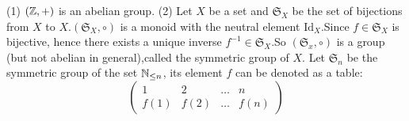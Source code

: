 \documentclass{book}
\numberwithin{equation}{section}
\begin{document}
\begin{exampleenv}
    \quad
    \newline
    (1) $(\mathbb{Z},+)$ is an abelian group.
    \newline
    (2) Let $X$ be a set and $\mathfrak{S}_X$ be the set of bijections from $X$ to $X$.$(\mathfrak{S}_X ,\circ)$ is a monoid with the neutral element $\mathrm{Id}_X$.Since $f\in \mathfrak{S}_X $ is bijective, hence there exists a unique inverse $f^{-1}\in \mathfrak{S} _X$.So $(\mathfrak{S} _x,\circ)$ is a group (but not abelian in general),called the symmetric group of $X$.
    \newline
    Let $\mathfrak{S} _n$ be the symmetric group of the set $\mathbb{N}_{\le n}$, its element $f$ can be denoted as a table:
    $$\begin{pmatrix}
  1&2  &\dots &n \\
  f(1)& f(2) &\dots   &f(n)
\end{pmatrix}$$
\end{exampleenv}
\end{document}
